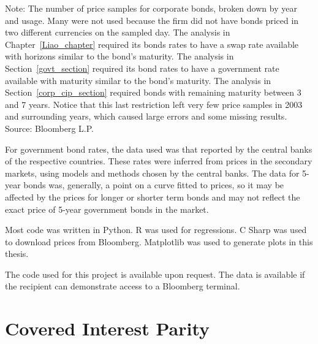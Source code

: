 \begin{table}[p]
\raggedright 
 Note: {\small The number of price samples for corporate bonds, broken down by year and usage.  Many were not used because the firm did not have bonds priced in two different currencies on the sampled day.  The analysis in Chapter~\ref{Liao_chapter} required its bonds rates to have a swap rate available with horizons similar to the bond's maturity.  The analysis in Section~\ref{govt_section} required its bond rates to have a government rate available with maturity similar to the bond's maturity.  The analysis in Section~\ref{corp_cip_section} required bonds with remaining maturity between 3 and 7 years.  Notice that this last restriction left very few price samples in 2003 and surrounding years, which caused large errors and some missing results.  }
\newline Source: Bloomberg L.P.
\end{table}



For government bond rates, the data used was that reported by the central banks of the respective countries.\cite{USD_central_bank, AUD_central_bank, CAD_central_bank, CHF_central_bank, EUR_central_bank, GBP_central_bank, JPY_central_bank, NOK_central_bank, NZD_central_bank, SEK_central_bank}  These rates were inferred from prices in the secondary markets, using models and methods chosen by the central banks.  The data for 5-year bonds was, generally, a point on a curve fitted to prices, so it may be affected by the prices for longer or shorter term bonds and may not reflect the exact price of 5-year government bonds in the market.  




Most code was written in Python.  R was used for regressions.  C Sharp was used to download prices from Bloomberg.  Matplotlib was used to generate plots in this thesis.  


The code used for this project is available upon request.  The data is available if the recipient can demonstrate access to a Bloomberg terminal.



\chapter{Covered Interest Parity } \label{CIP_chapter}

